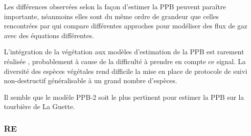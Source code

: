 Les différences observées selon la façon d'estimer la PPB peuvent paraître importante, néanmoins elles sont du même ordre de grandeur que celles rencontrées par \citet{worrall2009} qui compare différentes approches pour modéliser des flux de gaz avec des équations différentes.

L'intégration de la végétation aux modèles d'estimation de la PPB est rarement réalisée \citep{bortoluzzi2006a,gorres2014}, probablement à cause de la difficulté à prendre en compte ce signal.
La diversité des espèces végétales rend difficile la mise en place de protocole de suivi non-destructif généralisable à un grand nombre d'espèces.

Il semble que le modèle PPB-2 soit le plus pertinent pour estimer la PPB sur la tourbière de La Guette.

%



\subsubsection{RE}

